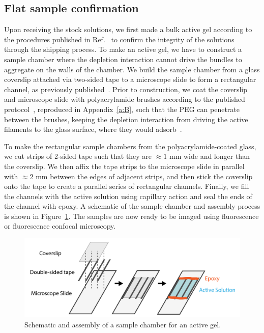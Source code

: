 \subsection{Flat sample confirmation}
Upon receiving the stock solutions, we first made a bulk active gel according to the procedures published in Ref.~\cite{RN3} to confirm the integrity of the solutions through the shipping process.
To make an active gel, we have to construct a sample chamber where the depletion interaction cannot drive the bundles to aggregate on the walls of the chamber.
We build the sample chamber from a glass coverslip attached via two-sided tape to a microscope slide to form a rectangular channel, as previously published~\cite{RN3}.
Prior to construction, we coat the coverslip and microscope slide with polyacrylamide brushes according to the published protocol~\cite{RN3}, reproduced in Appendix~\ref{a:B}, such that the PEG can penetrate between the brushes, keeping the depletion interaction from driving the active filaments to the glass surface, where they would adsorb~\cite{RN3}.

To make the rectangular sample chambers from the polyacrylamide-coated glass, we cut strips of 2-sided tape such that they are $\approx1$ mm wide and longer than the coverslip.
We then affix the tape strips to the microscope slide in parallel with $\approx 2$ mm between the edges of adjacent strips, and then stick the coverslip onto the tape to create a parallel series of rectangular channels.
Finally, we fill the channels with the active solution using capillary action and seal the ends of the channel with epoxy.
A schematic of the sample chamber and assembly process is shown in Figure~\ref{f:3-SampleChamber}.
The samples are now ready to be imaged using fluorescence or fluorescence confocal microscopy.
\begin{figure}
  \centering
  \includegraphics{figures/C3/Ch3-Figs_GelSampleChamber.png}
  \caption{Schematic and assembly of a sample chamber for an active gel.}
  \label{f:3-SampleChamber}
\end{figure}

